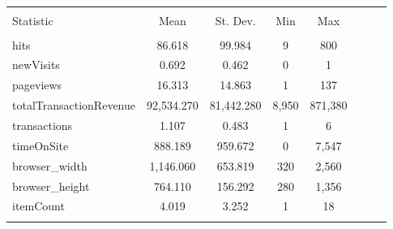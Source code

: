 \begin{table}[!htbp] \centering 
  \caption{} 
  \label{} 
\begin{tabular}{@{\extracolsep{5pt}}lccccccc} 
\\[-1.8ex]\hline 
\hline \\[-1.8ex] 
Statistic & \multicolumn{1}{c}{Mean} & \multicolumn{1}{c}{St. Dev.} & \multicolumn{1}{c}{Min} & \multicolumn{1}{c}{Max} \\ 
\hline \\[-1.8ex] 
hits & 86.618 & 99.984 & 9 & 800 \\ 
newVisits & 0.692 & 0.462 & 0  & 1 \\ 
pageviews & 16.313 & 14.863 & 1  & 137 \\ 
totalTransactionRevenue & 92,534.270 & 81,442.280 & 8,950  & 871,380 \\ 
transactions & 1.107 & 0.483 & 1 & 6 \\ 
timeOnSite & 888.189 & 959.672 & 0  & 7,547 \\ 
browser\_width & 1,146.060 & 653.819 & 320 & 2,560 \\ 
browser\_height & 764.110 & 156.292 & 280  & 1,356 \\ 
itemCount & 4.019 & 3.252 & 1  & 18 \\ 
\hline \\[-1.8ex] 
\end{tabular} 
\end{table} 




